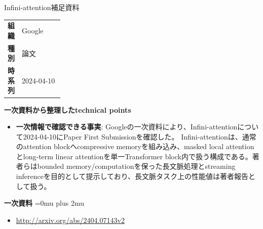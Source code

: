 \Needspace{0.38\textheight}
\begin{technicalnote}{Infini-attention}{補足資料}
\begingroup
\begin{tabularx}{\linewidth}{@{}>{\bfseries}p{0.22\linewidth}X@{}}
組織 & Google \\
種別 & 論文 \\
時系列 & 2024-04-10 \\
\end{tabularx}
\smallskip
\begin{minipage}{\linewidth}
{\bfseries 一次資料から整理したtechnical points}
\begin{itemize}[leftmargin=1.5em,itemsep=0.35em]
\item \textbf{一次情報で確認できる事実}: Googleの一次資料により、Infini-attentionについて2024-04-10にPaper First Submissionを確認した。 Infini-attentionは、通常のattention blockへcompressive memoryを組み込み、masked local attentionとlong-term linear attentionを単一Transformer block内で扱う構成である。著者らはbounded memory/computationを保った長文脈処理とstreaming inferenceを目的として提示しており、長文脈タスク上の性能値は著者報告として扱う。
\end{itemize}
\begin{minipage}{\linewidth}
\begin{samepage}
{\bfseries 一次資料}
\begingroup\sloppy
\Urlmuskip=0mu plus 2mu\relax
\begin{itemize}[leftmargin=1.5em,itemsep=0.25em]
\item {\scriptsize\url{http://arxiv.org/abs/2404.07143v2}}
\end{itemize}
\endgroup
\end{samepage}
\end{minipage}
\end{minipage}
\endgroup
\end{technicalnote}
\medskip

